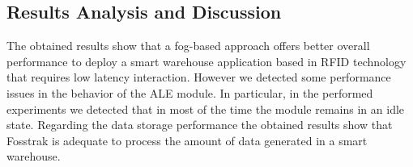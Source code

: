 \subsection{Results Analysis and Discussion}
\label{sub:results_analysis_discussion}
The obtained results show that a fog-based approach offers better overall performance to deploy a
smart warehouse application based in RFID technology that requires low latency interaction. However
we detected some performance issues in the behavior of the \gls{ALE} module. In particular, in the
performed experiments we detected that in most of the time the module remains in an idle state.
Regarding the data storage performance the obtained results show that Fosstrak is adequate
to process the amount of data generated in a smart warehouse.
